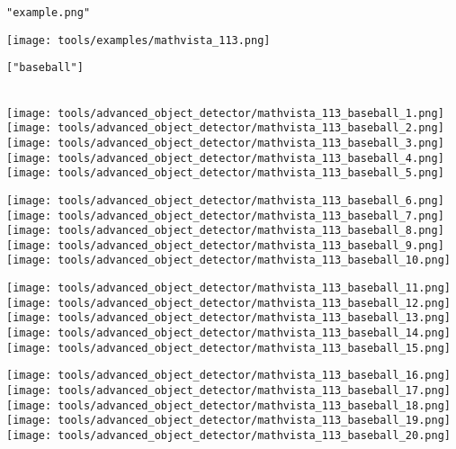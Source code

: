 \begin{textcolorbox}
 \texttt{"example.png"}

\vspace{0.2cm}
\texttt{[image: tools/examples/mathvista\_113.png]}
\vspace{0.2cm}

 \texttt{["baseball"]}
\\\\

\texttt{[image: tools/advanced\_object\_detector/mathvista\_113\_baseball\_1.png]}
\texttt{[image: tools/advanced\_object\_detector/mathvista\_113\_baseball\_2.png]}
\texttt{[image: tools/advanced\_object\_detector/mathvista\_113\_baseball\_3.png]}
\texttt{[image: tools/advanced\_object\_detector/mathvista\_113\_baseball\_4.png]}
\texttt{[image: tools/advanced\_object\_detector/mathvista\_113\_baseball\_5.png]}

\texttt{[image: tools/advanced\_object\_detector/mathvista\_113\_baseball\_6.png]}
\texttt{[image: tools/advanced\_object\_detector/mathvista\_113\_baseball\_7.png]}
\texttt{[image: tools/advanced\_object\_detector/mathvista\_113\_baseball\_8.png]}
\texttt{[image: tools/advanced\_object\_detector/mathvista\_113\_baseball\_9.png]}
\texttt{[image: tools/advanced\_object\_detector/mathvista\_113\_baseball\_10.png]}

\texttt{[image: tools/advanced\_object\_detector/mathvista\_113\_baseball\_11.png]}
\texttt{[image: tools/advanced\_object\_detector/mathvista\_113\_baseball\_12.png]}
\texttt{[image: tools/advanced\_object\_detector/mathvista\_113\_baseball\_13.png]}
\texttt{[image: tools/advanced\_object\_detector/mathvista\_113\_baseball\_14.png]}
\texttt{[image: tools/advanced\_object\_detector/mathvista\_113\_baseball\_15.png]}

\texttt{[image: tools/advanced\_object\_detector/mathvista\_113\_baseball\_16.png]}
\texttt{[image: tools/advanced\_object\_detector/mathvista\_113\_baseball\_17.png]}
\texttt{[image: tools/advanced\_object\_detector/mathvista\_113\_baseball\_18.png]}
\texttt{[image: tools/advanced\_object\_detector/mathvista\_113\_baseball\_19.png]}
\texttt{[image: tools/advanced\_object\_detector/mathvista\_113\_baseball\_20.png]}
    

\end{textcolorbox}

